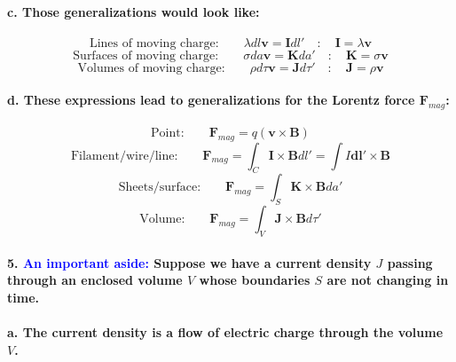 \documentclass{article}
\begin{document}
\paragraph{\indent c. Those generalizations would look like:}
\begin{equation*}
    \text{Lines of moving charge:}\quad\quad \lambda dl\boldsymbol{v}=\boldsymbol{I}dl'\quad:\quad \boldsymbol{I}=\lambda\boldsymbol{v}
\end{equation*}
\begin{equation*}
    \text{Surfaces of moving charge:}\quad\quad \sigma da\boldsymbol{v}=\boldsymbol{K}da'\quad:\quad \boldsymbol{K}=\sigma\boldsymbol{v}
\end{equation*}
\begin{equation*}
    \text{Volumes of moving charge:}\quad\quad \rho d\tau \boldsymbol{v}=\boldsymbol{J}d\tau'\quad:\quad \boldsymbol{J}=\rho\boldsymbol{v}
\end{equation*} 
\paragraph{\indent d. These expressions lead to generalizations for the Lorentz force $\boldsymbol{F}_{mag}$:}
\begin{equation*}
    \text{Point:} \quad\quad \boldsymbol{F}_{mag}=q(\boldsymbol{v}\times\boldsymbol{B})
\end{equation*}
\begin{equation*}
    \text{Filament/wire/line:} \quad\quad \boldsymbol{F}_{mag}=\int_C\boldsymbol{I}\times\boldsymbol{B}dl'=\int I\boldsymbol{dl'}\times \boldsymbol{B}
\end{equation*}
\begin{equation*}
    \text{Sheets/surface:}\quad\quad \boldsymbol{F}_{mag}=\int_S \boldsymbol{K}\times\boldsymbol{B}da'
\end{equation*}
\begin{equation*}
    \text{Volume:} \quad\quad \boldsymbol{F}_{mag}=\int_V\boldsymbol{J}\times\boldsymbol{B}d\tau'
\end{equation*}
\paragraph{5. \textcolor{blue}{An important aside:} Suppose we have a current density $J$ passing through an enclosed volume $V$ whose boundaries $S$ are not changing in time.}
\paragraph{\indent a. The current density is a flow of electric charge through the volume $V$.}
\end{document}

